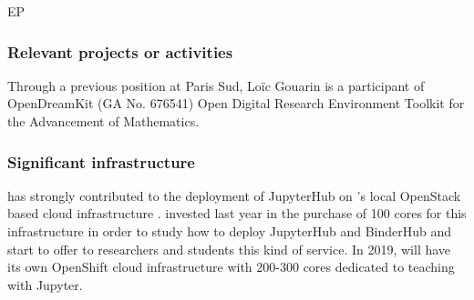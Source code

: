 \begin{sitedescription}{EP}
\subsubsection*{Relevant projects or activities}

\begin{compactenum}
\item Through a previous position at Paris Sud, Loïc Gouarin is a
  participant of OpenDreamKit (GA No. 676541) Open Digital Research
  Environment Toolkit for the Advancement of Mathematics.
\end{compactenum}

\subsubsection*{Significant infrastructure}

 has strongly contributed to the deployment of JupyterHub on
's local OpenStack based cloud infrastructure
.  invested last year in the purchase of 100 cores for this infrastructure in order to study how to deploy JupyterHub and BinderHub and start to offer to researchers and students this kind of service.
In 2019,  will have its own OpenShift cloud infrastructure with 200-300 cores dedicated to teaching with Jupyter.

\end{sitedescription}
